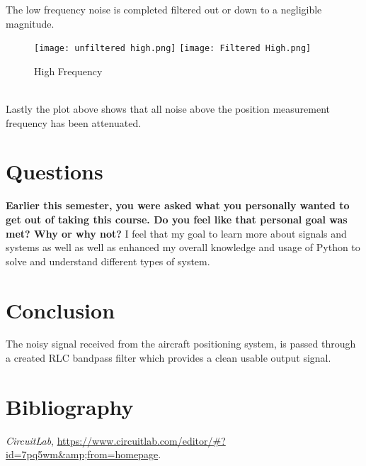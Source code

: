 \documentclass[12pt]{report}
\begin{document}
The low frequency noise is completed filtered out or down to a negligible magnitude. 
\newpage 
\begin{figure}[h!]
    \centering
    \texttt{[image: unfiltered high.png]}
    \texttt{[image: Filtered High.png]}
    \caption{High Frequency}
    \label{Task 1}
\end{figure}

\\
Lastly the plot above shows that all noise above the position measurement frequency has been attenuated. 
\newpage 
\section{Questions}
\textbf{Earlier this semester, you were asked what you personally wanted to get
out of taking this course. Do you feel like that personal goal was met?
Why or why not?}\newline
\newline
I feel that my goal to learn more about signals and systems as well as well as enhanced my overall knowledge and usage of Python to solve and understand different types of system.  
\newline
\section{Conclusion}
The noisy signal received from the aircraft positioning system, is passed through a created RLC bandpass filter which provides a clean usable output signal. 

\section{Bibliography}
\textit{CircuitLab},  \url{https://www.circuitlab.com/editor/#?id=7pq5wm&amp;from=homepage}.

\newpage
\end{document}
